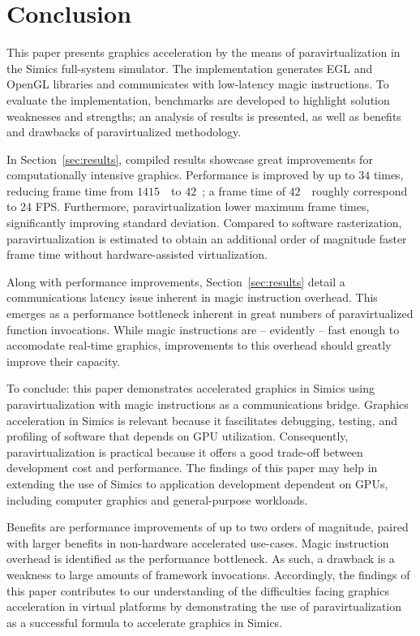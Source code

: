 
\section{Conclusion}
\label{sec:conclusion}
This paper presents graphics acceleration by the means of paravirtualization in the Simics full-system simulator.
The implementation generates EGL and OpenGL libraries and communicates with low-latency magic instructions.
To evaluate the implementation, benchmarks are developed to highlight solution weaknesses and strengths; an analysis of results is presented, as well as benefits and drawbacks of paravirtualized methodology.

In Section~\ref{sec:results}, compiled results showcase great improvements for computationally intensive graphics.
Performance is improved by up to $34$ times, reducing frame time from $1415$~\milli\second\ to $42$~\milli\second ; a frame time of $42$~\milli\second\ roughly correspond to 24 FPS.
Furthermore, paravirtualization lower maximum frame times, significantly improving standard deviation.
Compared to software rasterization, paravirtualization is estimated to obtain an additional order of magnitude faster frame time without hardware-assisted virtualization.

Along with performance improvements, Section~\ref{sec:results} detail a communications latency issue inherent in magic instruction overhead.
This emerges as a performance bottleneck inherent in great numbers of paravirtualized function invocations.
While magic instructions are -- evidently -- fast enough to accomodate real-time graphics, improvements to this overhead should greatly improve their capacity.

To conclude: this paper demonstrates accelerated graphics in Simics using paravirtualization with magic instructions as a communications bridge.
Graphics acceleration in Simics is relevant because it fascilitates debugging, testing, and profiling of software that depends on GPU utilization.
Consequently, paravirtualization is practical because it offers a good trade-off between development cost and performance.
The findings of this paper may help in extending the use of Simics to application development dependent on GPUs, including computer graphics and general-purpose workloads.

Benefits are performance improvements of up to two orders of magnitude, paired with larger benefits in non-hardware accelerated use-cases.
Magic instruction overhead is identified as the performance bottleneck.
As such, a drawback is a weakness to large amounts of framework invocations.
Accordingly, the findings of this paper contributes to our understanding of the difficulties facing graphics acceleration in virtual platforms by demonstrating the use of paravirtualization as a successful formula to accelerate graphics in Simics.

